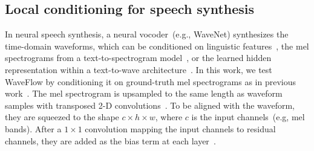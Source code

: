 \documentclass{article}
\begin{document}
\vspace{-.2em}
\subsection{Local conditioning for speech synthesis}
\vspace{-.1em}
In neural speech synthesis, a neural vocoder~(e.g., WaveNet) synthesizes the time-domain waveforms, which can be conditioned on linguistic features~\citep{oord2016wavenet,arik2017DV1}, the mel spectrograms from a text-to-spectrogram model~\citep{ping2017deep, shen2018tacotron2}, or the learned hidden representation within a text-to-wave architecture~\citep{ping2018clarinet}. 
In this work, we test WaveFlow by conditioning it on ground-truth mel spectrograms as in previous work~\citep{prenger2019waveglow,kim2018flowavenet}.
The mel spectrogram is upsampled to the same length as waveform samples with transposed 2-D convolutions~\citep{ping2018clarinet}.
To be aligned with the waveform, they are squeezed to the shape $c\times h\times w$, where $c$ is the input channels~(e.g, mel bands).
After a $1\times1$ convolution mapping the input channels to residual channels, they are added as the bias term at each layer~\citep{ping2018clarinet}.

\vspace{-.1em}
\end{document}
